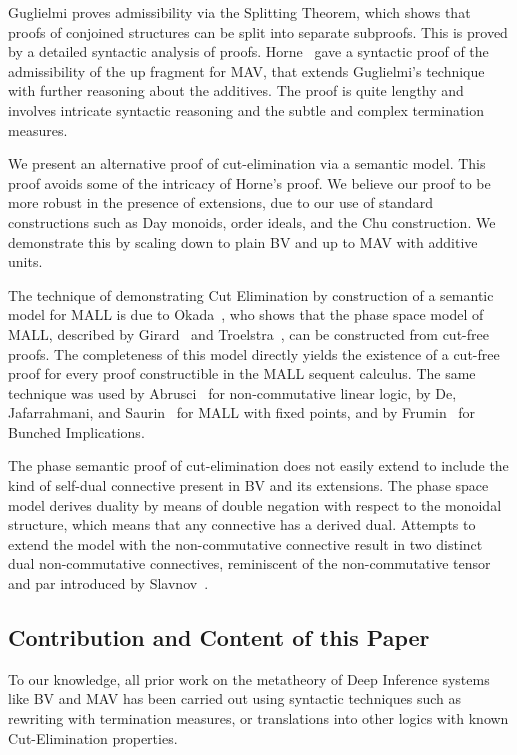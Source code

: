 Guglielmi \cite[\S4.1]{Guglielmi14:di} proves admissibility via the Splitting Theorem, which shows that proofs of conjoined structures can be split into separate subproofs. This is proved by a detailed syntactic analysis of proofs. Horne~\cite{Horne15:mav} gave a syntactic proof of the admissibility of the up fragment for MAV, that extends Guglielmi's technique with further reasoning about the additives. The proof is quite lengthy and involves intricate syntactic reasoning and the subtle and complex termination measures.

We present an alternative proof of cut-elimination via a semantic model. This proof avoids some of the intricacy of Horne's proof. We believe our proof to be more robust in the presence of extensions, due to our use of standard constructions such as Day monoids, order ideals, and the Chu construction. We demonstrate this by scaling down to plain BV and up to MAV with additive units.

The technique of demonstrating Cut Elimination by construction of a semantic model for MALL is due to Okada~\cite{Okada99:psc}, who shows that the phase space model of MALL, described by Girard~\cite[\S4.1]{Girard87:ll} and Troelstra~\cite[]{Troelstra92:lll}, can be constructed from cut-free proofs.
The completeness of this model directly yields the existence of a cut-free proof for every proof constructible in the MALL sequent calculus.
The same technique was used by Abrusci~\cite{Abrusci91:psc} for non-commutative linear logic, by De, Jafarrahmani, and Saurin~\cite{De22:psc} for MALL with fixed points, and by Frumin~\cite{Frumin22:psc} for Bunched Implications.

The phase semantic proof of cut-elimination does not easily extend to include the kind of self-dual connective present in BV and its extensions.
The phase space model derives duality by means of double negation with respect to the monoidal structure, which means that any connective has a derived dual. Attempts to extend the model with the non-commutative connective result in two distinct dual non-commutative connectives, reminiscent of the non-commutative tensor and par introduced by Slavnov~\cite{Slavnov19:scmll}.

\subsection{Contribution and Content of this Paper}

To our knowledge, all prior work on the metatheory of Deep Inference systems like BV and MAV has been carried out using syntactic techniques such as rewriting with termination measures, or translations into other logics with known Cut-Elimination properties.

